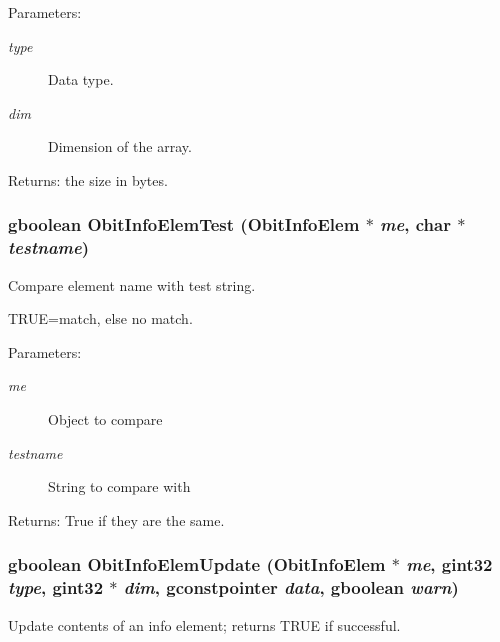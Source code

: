 \begin{Desc}
\item[Parameters:]
\begin{description}
\item[{\em type}]Data type. \item[{\em dim}]Dimension of the array. \end{description}
\end{Desc}
\begin{Desc}
\item[Returns:]the size in bytes. \end{Desc}
\subsubsection{\setlength{\rightskip}{0pt plus 5cm}gboolean Obit\-Info\-Elem\-Test ({\bf Obit\-Info\-Elem} $\ast$ {\em me}, char $\ast$ {\em testname})}\label{ObitInfoElem_8c_a3}


Compare element name with test string. 

TRUE=match, else no match. \begin{Desc}
\item[Parameters:]
\begin{description}
\item[{\em me}]Object to compare \item[{\em testname}]String to compare with \end{description}
\end{Desc}
\begin{Desc}
\item[Returns:]True if they are the same. \end{Desc}
\subsubsection{\setlength{\rightskip}{0pt plus 5cm}gboolean Obit\-Info\-Elem\-Update ({\bf Obit\-Info\-Elem} $\ast$ {\em me}, gint32 {\em type}, gint32 $\ast$ {\em dim}, gconstpointer {\em data}, gboolean {\em warn})}\label{ObitInfoElem_8c_a5}


Update contents of an info element; returns TRUE if successful. 

